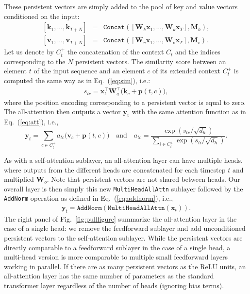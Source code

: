\documentclass{article}
\begin{document}
These persistent vectors are simply added to the pool of key and value vectors conditioned on the input:
\begin{eqnarray}
  \left[\mathbf{k}_1, \dots, \mathbf{k}_{T+N}\right] &=& \texttt{Concat}\left( [\mathbf{W}_k \mathbf{x}_1, \dots, \mathbf{W}_k \mathbf{x}_T ], \mathbf{M}_k \right),\\
  \left[\mathbf{v}_1, \dots, \mathbf{v}_{T+N}\right] &=& \texttt{Concat}\left( [\mathbf{W}_v \mathbf{x}_1, \dots, \mathbf{W}_v \mathbf{x}_T ], \mathbf{M}_v \right).
\end{eqnarray}
Let us denote by $C_t^+$ the concatenation of the context $C_t$ and the indices corresponding to the $N$ persistent vectors.
The similarity score between an element $t$ of the input sequence and an element $c$ of its extended context $C_t^+$ is computed the same way as in Eq.~(\ref{eq:sim}), i.e.:
\begin{eqnarray}
  \label{eq:scoremem}
  s_{tc}=\mathbf{x}_t^\top \mathbf{W}_q^\top \big( \mathbf{k}_c + \mathbf{p}(t, c)\big),
\end{eqnarray}
where the position encoding corresponding to a persistent vector is equal to zero.
The all-attention then outputs a vector $\mathbf{y_t}$ with the same attention function as in Eq.~(\ref{eq:att}), i.e.,
\begin{equation}\label{eq:attmem}
  \mathbf{y}_t = \sum_{c\in C_t^+} a_{tc} \big( \mathbf{v}_c + \mathbf{p}(t, c) \big) \textrm{~~~and~~~}a_{tc}=\frac{\exp\left( s_{tc} / \sqrt{d_h} \right)}{\sum\limits_{i\in C_t^+}\exp\left( s_{ti} / \sqrt{d_h} \right)}.
\end{equation}

As with a self-attention sublayer, an all-attention layer can have multiple heads,
where outputs from the different heads are concatenated for each timestep $t$ and multiplied $\mathbf{W}_o$.
Note that persistent vectors are not shared between heads.
Our overall layer is then simply this new \texttt{MultiHeadAllAttn} sublayer followed by the \texttt{AddNorm} operation as defined in Eq.~(\ref{eq:addnorm}), i.e.,
\begin{eqnarray}
  \mathbf{y}_t = \texttt{AddNorm}\left(\texttt{MultiHeadAllAttn}(\mathbf{x}_t)\right).
\end{eqnarray}
The right panel of Fig.~\ref{fig:pullfigure} summarize the all-attention layer in the case of a single head: we remove the feedforward sublayer and add unconditioned persistent vectors to the self-attention sublayer.
While the persistent vectors are directly comparable to a feedforward sublayer in the case of a single head, a multi-head version is more comparable to multiple small feedforward layers working in parallel.
If there are as many persistent vectors as the ReLU units, an all-attention layer has the same number of parameters as the standard transformer layer regardless of the number of heads (ignoring bias terms).
\end{document}
